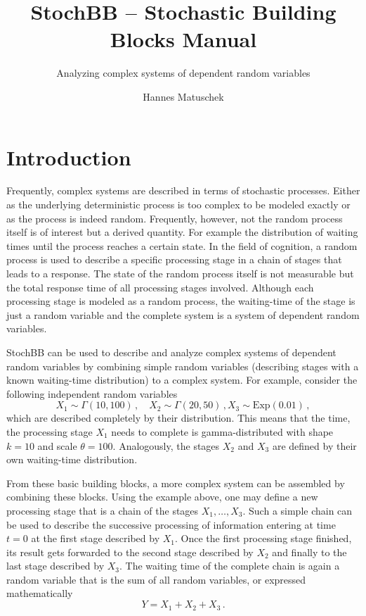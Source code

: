 \documentclass[a4paper, 10pt]{paper}
\title{StochBB -- Stochastic Building Blocks Manual}
\subtitle{Analyzing complex systems of dependent random variables}
\author{Hannes Matuschek}
\begin{document}
\maketitle
 
\section{Introduction} \label{sec:intro}
Frequently, complex systems are described in terms of stochastic processes. Either as the
underlying deterministic process is too complex to be modeled exactly or as the
process is indeed random. Frequently, however, not the random process itself is of 
interest but a derived quantity. For example the distribution of waiting times until the
process reaches a certain state. In the field of cognition, a random process is used to
describe a specific processing stage in a chain of stages that leads to a response. The state of
the random process itself is not measurable but the total response time of all processing 
stages involved. Although each processing stage is modeled as a random process, the waiting-time
of the stage is just a random variable and the complete system is a system of dependent random 
variables.

StochBB can be used to describe and analyze complex systems of dependent random variables
by combining simple random variables (describing stages with a known waiting-time distribution) to
a complex system. For example, consider the following independent random variables
\begin{equation}
  X_1 \sim \Gamma(10, 100)\,,\quad X_2 \sim \Gamma(20, 50)\,, X_3 \sim \text{Exp}(0.01)\,,\nonumber
\end{equation}
which are described completely by their distribution. This means that the time, the
processing stage $X_1$ needs to complete is gamma-distributed with shape $k=10$ and scale
$\theta=100$. Analogously, the stages $X_2$ and $X_3$ are defined by their own waiting-time 
distribution.

From these basic building blocks, a more complex system can be assembled by
combining these blocks. Using the example above, one may define a new processing stage that is a chain of
the stages $X_1,\dots,X_3$. Such a simple chain can be used to describe the successive
processing of information entering at time $t=0$ at the first stage described by $X_1$.
Once the first processing stage finished, its result gets forwarded to the second stage described
by $X_2$ and finally to the last stage described by $X_3$. The waiting time of the
complete chain is again a random variable that is the sum of all random variables,
or expressed mathematically
\begin{equation}
 Y = X_1 + X_2 + X_3\,. \nonumber
\end{equation}
\end{document}
